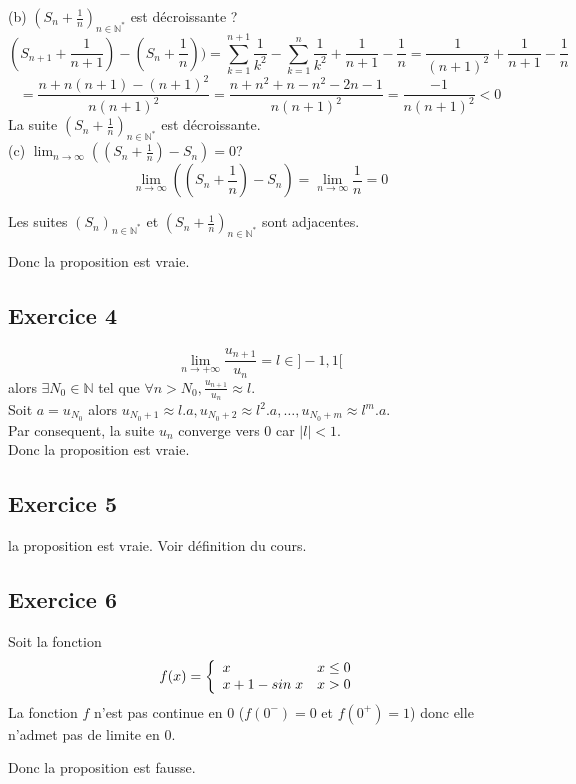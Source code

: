 \documentclass[]{book}
\theoremstyle{definition}
\newcommand{\bb}[1]{\mathbb{#1}}
\newcommand{\N}{\bb{N}}
\begin{document}
(b) $(S_n+\frac{1}{n})_{n \in \N^{*}}$ est d\'ecroissante ?\\
$$(S_{n+1} +\frac{1}{n+1}) - (S_{n}+\frac{1}{n})) = \sum_{k=1}^{n+1}\frac{1}{k^2} - \sum_{k=1}^{n}\frac{1}{k^2} + \frac{1}{n+1} - \frac{1}{n} = \frac{1}{(n+1)^2} + \frac{1}{n+1} - \frac{1}{n}$$  
$$= \frac{n+n(n+1)-(n+1)^2}{n(n+1)^2} = \frac{n+n^2+n-n^2-2n-1}{n(n+1)^2} = \frac{-1}{n(n+1)^2} < 0$$
La suite $(S_n+\frac{1}{n})_{n \in \N^{*}}$ est d\'ecroissante.\\

(c) $\lim_{n \to \infty}((S_n + \frac{1}{n}) - S_n) = 0 $?
$$\lim_{n \to \infty}((S_n + \frac{1}{n}) - S_n) = \lim_{n \to \infty}\frac{1}{n} = 0 $$


Les suites $(S_n)_{n \in \N^{*}}$ et $(S_n+\frac{1}{n})_{n \in \N^{*}}$ sont adjacentes.

Donc la proposition est vraie.

\subsection*{Exercice 4}
$$\lim_{n \to +\infty} \frac{u_{n+1}}{u_{n}} = l \in ]-1,1[$$ 
alors $\exists N_0 \in \mathbb{N}$ tel que $\forall n > N_{0}, \frac{u_{n+1}}{u_{n}} \approx l$. \\
Soit $a = u_{N_0}$ alors $u_{N_0+1} \approx l.a, u_{N_0+2} \approx {l^2.a}, \ldots , u_{N_0+m} \approx {l^{m}.a}$. \\
Par consequent, la suite $u_n$ converge vers $0$ car $|l| < 1$.
\\ 
Donc la proposition est vraie.


\subsection*{Exercice 5}
la proposition est vraie. Voir d\'efinition du cours.

\subsection*{Exercice 6}
Soit la fonction 
$$f(x) = 
\left\{ 
\begin{array}{l l}
 x &  x \le 0\\
 x+1-sin\; x & x > 0\\
\end{array}
\right. 
$$
La fonction $f$ n'est pas continue en $0$ ($f(0^-) = 0$ et $f(0^+) = 1$) donc elle n'admet pas de limite en $0$.

Donc la proposition est fausse.
\end{document}
